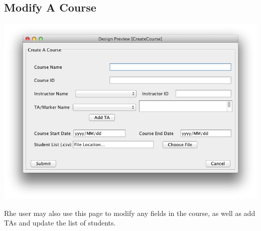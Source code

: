 \documentclass{article}
\begin{document}
\subsection{Modify A Course}
\begin{center} 
   	\includegraphics[scale=0.55]{../images/UpdatedUIScreens/CreateCourse.png}
\end{center} 
Rhe user may also use this page to modify any fields in the course, as well as add TAs and update the list of students.
\clearpage
\end{document}
